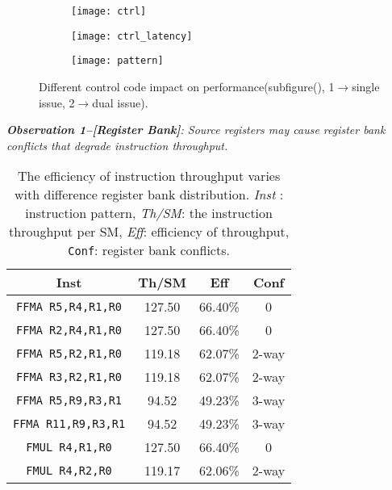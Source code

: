 \begin{figure*}
    \begin{subfigure}[htbp]{0.3\textwidth}
        \texttt{[image: ctrl]}
        \subcaption{}
        \label{fig:control_throughput}
    \end{subfigure}
    \begin{subfigure}[htbp]{0.3\textwidth}
        \texttt{[image: ctrl\_latency]}
        \subcaption{}
        \label{fig:control_latency}
    \end{subfigure}
    \begin{subfigure}[htbp]{0.3\textwidth}
        \texttt{[image: pattern]}
        \subcaption{}
        \label{fig:control_pattern}
    \end{subfigure}
    \caption{Different control code impact on performance(subfigure(), 1$\rightarrow$single
    issue, 2$\rightarrow$dual issue).}
    \label{fig:control_code}
\end{figure*}


{\em {\bf Observation 1--[Register Bank]}:
Source registers may cause register bank conflicts that degrade instruction throughput.}
\begin{table}[htbp]
    \caption{The efficiency of instruction throughput varies with difference register bank distribution. {\it Inst} :
instruction pattern, {\it Th/SM}: the instruction throughput per SM, {\it Eff}: efficiency of throughput, {\tt Conf}: register bank conflicts.}
\centering
\scalebox{0.9} {
\begin{tabular}{|c|c|c|c|}
\hline
Inst &Th/SM&Eff&Conf\\
\hline
{\tt FFMA R5,R4,R1,R0}&127.50&66.40\%&0\\
\hline
{\tt FFMA R2,R4,R1,R0}&127.50&66.40\%&0\\
\hline
{\tt FFMA R5,R2,R1,R0}&119.18&62.07\%&2-way\\
\hline
{\tt FFMA R3,R2,R1,R0}&119.18&62.07\%&2-way\\
\hline
{\tt FFMA R5,R9,R3,R1}&94.52&49.23\%&3-way\\
\hline
{\tt FFMA R11,R9,R3,R1}&94.52&49.23\%&3-way\\
\hline
{\tt FMUL R4,R1,R0}&127.50&66.40\%&0\\
\hline
{\tt FMUL R4,R2,R0}&119.17&62.06\%&2-way\\
\hline
\end{tabular}
}
\label{tab:th}
\end{table}


